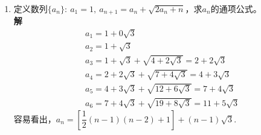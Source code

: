 \begin{enumerate}[label={【\textbf{例\thechapter.\arabic*}】},
 leftmargin=\inteval{\myenumleftmargin}pt,
 itemsep=\inteval{\myenumitempsep}pt,
 itemindent=\inteval{\myenumitemindent}pt]
满足$ m^2-5n^2=1 $的整数$ m,n $更稀少，在$ |m|<1000 $的范围内，
只有如下两组：
\begin{gather*}
    9^2-5\cdot 4^2=1,\quad  161^2-5\cdot 72^2=1
\end{gather*}
\textbf{注2}\ 敏锐的读者应该能察觉到，上面的$ \sqrt{3},\sqrt{5} $(只要$ \sqrt{C} $
不是有理数)与虚数单位$ \i $存在一些相似之处，消去$ \dfrac{1}{A+B\sqrt{C}} $
分母中的根号，与消去$ \dfrac{1}{A+B\i} $分母中的$ \i $，方法是一样的。对于复数
$ z_1,z_2 $，有$ |z_1z_2|=|z_1||z_2| $，但对于本例中的$ x $，不论是定义
$ |x|=\sqrt{a^2+b^2} $还是定义$ |x|=\sqrt{a^2+3b^2} $，
$ |xy| $与$ |x||y| $都不相等。

\item 定义数列$ \{a_n\}:\ a_1=1,\ a_{n+1}=a_n+\sqrt{2a_n+n} $，求$ a_n $的通项公式。\\
\textbf{解}\ 
\begin{align*}
    & a_1=1+0\sqrt{3} \\
    & a_2=1+\sqrt{3} \\
    & a_3=1+\sqrt{3}+\sqrt{4+2\sqrt{3}}=2+2\sqrt{3} \\
    & a_4=2+2\sqrt{3}+\sqrt{7+4\sqrt{3}}=4+3\sqrt{3} \\
    & a_5=4+3\sqrt{3}+\sqrt{12+6\sqrt{3}}=7+4\sqrt{3} \\
    & a_6=7+4\sqrt{3}+\sqrt{19+8\sqrt{3}}=11+5\sqrt{3} 
\end{align*}
容易看出，$ a_n=\left[\dfrac{1}{2}(n-1)(n-2)+1\right]+(n-1)\sqrt{3} $.


\end{enumerate}
